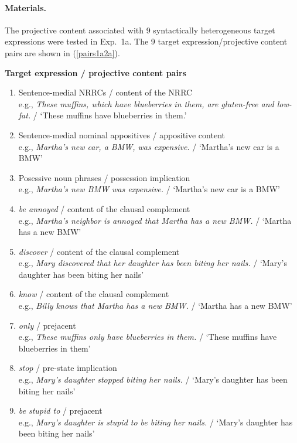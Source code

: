 \documentclass[11pt,fleqn]{article}
\newcommand{\6}{\mbox{$[\hspace*{-.6mm}[$}}
\newcommand{\9}{\mbox{$]\hspace*{-.6mm}]$}}
\begin{document}
\paragraph{Materials.} 

The projective content associated with 9 syntactically heterogeneous target expressions were tested in Exp.~1a. The 9 target expression/projective content pairs are shown in (\ref{pairs1a2a}).

\begin{exe}
\ex\label{pairs1a2a} {\bf Target expression / projective content pairs}

\begin{enumerate}[leftmargin=0cm,itemsep=-.5mm]

\item Sentence-medial NRRCs / content of the NRRC
\\ e.g., {\em These muffins, which have blueberries in them, are gluten-free and low-fat.} / `These muffins have blueberries in them.'

\item Sentence-medial nominal appositives / appositive content
\\ e.g., {\em Martha's new car, a BMW, was expensive.} / `Martha's new car is a BMW'

\item Posessive noun phrases / possession implication
\\ e.g., {\em Martha's new BMW was expensive.} / `Martha's new car is a BMW'

\item {\em be annoyed} / content of the clausal complement
\\ e.g., {\em Martha's neighbor is annoyed that Martha has a new BMW.} / `Martha has a new BMW'

\item {\em discover} / content of the clausal complement
\\ e.g., {\em Mary discovered that her daughter has been biting her nails.} / `Mary's daughter has been biting her nails'

\item {\em know} / content of the clausal complement
\\ e.g., {\em Billy knows that Martha has a new BMW.} /  `Martha has a new BMW'

\item {\em only} / prejacent
\\ e.g., {\em These muffins only have blueberries in them.} / `These muffins have blueberries in them'

\item {\em stop} / pre-state implication
\\ e.g., {\em Mary's daughter stopped biting her nails.}  / `Mary's daughter has been biting her nails'

\item {\em be stupid to} / prejacent
\\ e.g., {\em Mary's daughter is stupid to be biting her nails.} / `Mary's daughter has been biting her nails'

\end{enumerate}
\end{exe}
\end{document}
